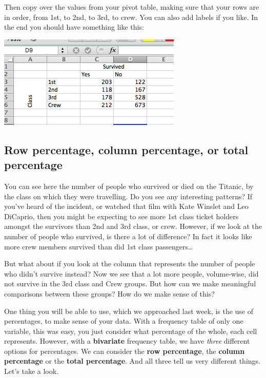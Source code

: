 \documentclass[
]{book}
\begin{document}
Then copy over the values from your pivot table, making sure that your rows are in order, from 1st, to 2nd, to 3rd, to crew. You can also add labels if you like. In the end you should have something like this:

\includegraphics{imgs/titanic_freq.png}

\hypertarget{row-percentage-column-percentage-or-total-percentage}{%
\subsection{Row percentage, column percentage, or total percentage}\label{row-percentage-column-percentage-or-total-percentage}}

You can see here the number of people who survived or died on the Titanic, by the class on which they were travelling. Do you see any interesting patterns? If you've heard of the incident, or watched that film with Kate Winslet and Leo DiCaprio, then you might be expecting to see more 1st class ticket holders amongst the survivors than 2nd and 3rd class, or crew. However, if we look at the number of people who survived, is there a lot of difference? In fact it looks like more crew members survived than did 1st class passengers\ldots{}

But what about if you look at the column that represents the number of people who didn't survive instead? Now we see that a lot more people, volume-wise, did not survive in the 3rd class and Crew groups. But how can we make meaningful comparisons between these groups? How do we make sense of this?

One thing you will be able to use, which we approached last week, is the use of percentages, to make sense of your data. With a frequency table of only one variable, this was easy, you just consider what percentage of the whole, each cell represents. However, with a \textbf{bivariate} frequency table, we have \emph{three} different options for percentages. We can consider the \textbf{row percentage}, the \textbf{column percentage} or the \textbf{total percentage}. And all three tell us very different things. Let's take a look.
\end{document}
